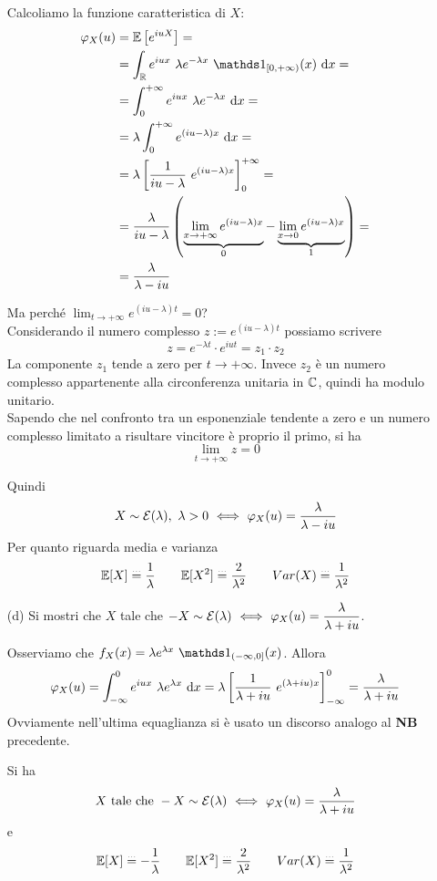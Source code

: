 \begin{enumerate}
Calcoliamo la funzione caratteristica di $X$:
\begin{gather*}
\begin{aligned}
\varphi_X(u)&=\EE\left[e^{iuX}  \right]=\\
&=\int_\RR e^{iux}\ \lambda e^{-\lambda x}\ \Ind_{[0,+\infty)}(x)\dx=\\
&=\int_0^{+\infty}e^{iux}\ \lambda e^{-\lambda x}\dx=\\
&=\lambda\int_0^{+\infty}e^{(iu-\lambda)x}\dx=\\
&=\lambda\left[\frac{1}{iu-\lambda}\ e^{(iu-\lambda)x}   \right]_0^{+\infty}=\\
&=\displaystyle\frac{\lambda}{iu-\lambda}\left( \underbrace{\lim_{x\to+\infty}e^{(iu-\lambda)x}}_{0}-\underbrace{\lim_{x\to 0}e^{(iu-\lambda)x}}_{1}   \right)=\\
&=\frac{\lambda}{\lambda-iu}
\end{aligned}
\end{gather*}
\begin{nb}
Ma perché $\displaystyle\lim_{t\to+\infty}e^{(iu-\lambda)t}=0$? \\
Considerando il numero complesso $z:=e^{(iu-\lambda)t}$ possiamo scrivere
\[
z=e^{-\lambda t}\cdot e^{iut}=z_1\cdot z_2
\]
La componente $z_1$ tende a zero per $t\to+\infty$. Invece $z_2$ è un numero complesso appartenente alla circonferenza unitaria in $\mathbb C$, quindi ha modulo unitario. \\
Sapendo che nel confronto tra un esponenziale tendente a zero e un numero complesso limitato a risultare vincitore è proprio il primo, si ha
\[
\displaystyle\lim_{t\to+\infty}z=0
\]
\end{nb}
Quindi
\[
X\sim\EEE(\lambda),\ \lambda>0\SESOLOSE\varphi_X(u)=\frac{\lambda}{\lambda-iu}
\]
Per quanto riguarda media e varianza
\[
\mathbb{E}[X]\overset{\underset{\dots}{}}{=}\frac{1}{\lambda} \qquad \mathbb{E}[X^2]\overset{\underset{\dots}{}}{=}\frac{2}{\lambda^2}\qquad Var(X)\overset{\underset{\dots}{}}{=}\frac{1}{\lambda^2}
\]

\item [(d)] Si mostri che $X$ tale che $-X\sim\mathcal{E}(\lambda)\ \Longleftrightarrow\ \varphi_X(u)=\dfrac{\lambda}{\lambda+iu}$.

Osserviamo che $f_X(x)=\lambda e^{\lambda x}\ \Ind_{(-\infty,0]}(x)$. Allora
\[
\varphi_X(u)=\int_{-\infty}^0e^{iux}\ \lambda e^{\lambda x}\dx=\lambda\left[\frac{1}{\lambda+iu}\ e^{(\lambda+iu)x}   \right]_{-\infty}^{0}=\frac{\lambda}{\lambda+iu}
\]
Ovviamente nell'ultima equaglianza si è usato un discorso analogo al \textbf{NB} precedente.

Si ha
\[
X\text{ tale che }-X\sim\mathcal{E}(\lambda)\ \Longleftrightarrow\ \varphi_X(u)=\dfrac{\lambda}{\lambda+iu}
\]
e
\[
\mathbb{E}[X]\overset{\underset{\dots}{}}{=}-\frac{1}{\lambda} \qquad \mathbb{E}[X^2]\overset{\underset{\dots}{}}{=}\frac{2}{\lambda^2}\qquad Var(X)\overset{\underset{\dots}{}}{=}\frac{1}{\lambda^2}
\]
\end{enumerate}


